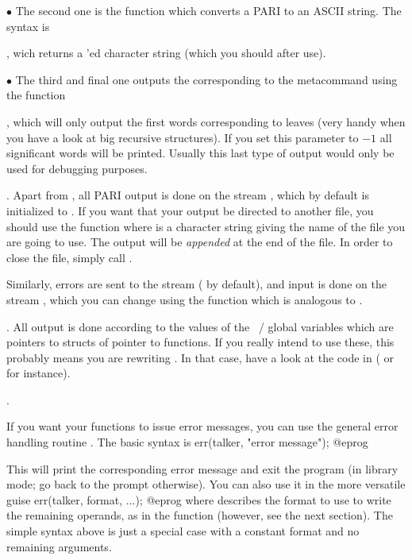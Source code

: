 \noindent $\bullet$ The second one is the function  which
converts a PARI  to an ASCII string. The syntax is

, wich returns a 'ed character
string (which you should  after use).

\noindent $\bullet$ The third and final one outputs the 
corresponding to the  metacommand  using the function

, which will only output the first
 words corresponding to leaves (very handy when you have a look at
big recursive structures). If you set this parameter to $-1$ all
significant words will be printed. Usually this last type of output would
only be used for debugging purposes.

. Apart from , all PARI output is done on
the stream , which by default is initialized to . If
you want that your output be directed to another file, you should use the
function  where  is a
character string giving the name of the file you are going to use. The
output will be \emph{appended} at the end of the file. In order to close
the file, simply call .

Similarly, errors are sent to the stream  (
by default), and input is done on the stream , which you can change
using the function  which is analogous to .

. All output is done according to the values
of the ~/  global variables which are pointers to
structs of pointer to functions. If you really intend to use these, this
probably means you are rewriting . In that case, have a look at the code in
 ( or  for instance).

.

\noindent
If you want your functions to issue error messages, you can use the general
error handling routine . The basic syntax is
%
\bprog
  err(talker, "error message");
@eprog

\noindent
This will print the corresponding error message and exit the program (in
library mode; go back to the  prompt otherwise).\label{se:err} You can
also use it in the more versatile guise
\bprog
  err(talker, format, ...);
@eprog\noindent
where  describes the format to use to write the remaining
operands, as in the  function (however, see the next section).
The simple syntax above is just a special case with a constant format and no
remaining arguments.

